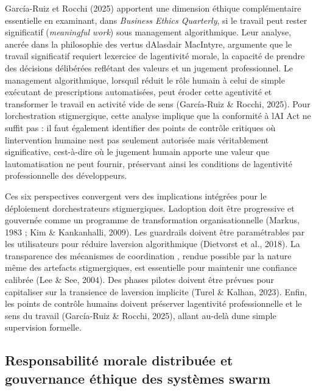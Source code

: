 \documentclass[12pt,a4paper]{article}
\begin{document}
García-Ruiz et Rocchi (2025) apportent une dimension éthique
complémentaire essentielle en examinant, dans \emph{Business Ethics
Quarterly}, si le travail peut rester significatif (\emph{meaningful
work}) sous management algorithmique. Leur analyse, ancrée dans la
philosophie des vertus d\textquotesingle Alasdair MacIntyre, argumente
que le travail significatif requiert l\textquotesingle exercice de
l\textquotesingle agentivité morale, la capacité de prendre des
décisions délibérées reflétant des valeurs et un jugement professionnel.
Le management algorithmique, lorsqu\textquotesingle il réduit le rôle
humain à celui de simple exécutant de prescriptions automatisées, peut
éroder cette agentivité et transformer le travail en activité vide de
sens (García-Ruiz \& Rocchi, 2025). Pour l\textquotesingle orchestration
stigmergique, cette analyse implique que la conformité à
l\textquotesingle AI Act ne suffit pas : il faut également identifier
des points de contrôle critiques où l\textquotesingle intervention
humaine n\textquotesingle est pas seulement autorisée mais véritablement
significative, c\textquotesingle est-à-dire où le jugement humain
apporte une valeur que l\textquotesingle automatisation ne peut fournir,
préservant ainsi les conditions de l\textquotesingle agentivité
professionnelle des développeurs.

Ces six perspectives convergent vers des implications intégrées pour le
déploiement d\textquotesingle orchestrateurs stigmergiques.
L\textquotesingle adoption doit être progressive et gouvernée comme un
programme de transformation organisationnelle (Markus, 1983 ; Kim \&
Kankanhalli, 2009). Les guardrails doivent être paramétrables par les
utilisateurs pour réduire l\textquotesingle aversion algorithmique
(Dietvorst et al., 2018). La transparence des mécanismes de coordination
, rendue possible par la nature même des artefacts stigmergiques,
est essentielle pour maintenir une confiance calibrée (Lee \& See,
2004). Des phases pilotes doivent être prévues pour capitaliser sur la
transience de l\textquotesingle aversion implicite (Turel \& Kalhan,
2023). Enfin, les points de contrôle humains doivent préserver
l\textquotesingle agentivité professionnelle et le sens du travail
(García-Ruiz \& Rocchi, 2025), allant au-delà d\textquotesingle une
simple supervision formelle.

\subsection{Responsabilité morale distribuée et gouvernance éthique des
systèmes
swarm}\label{responsabilituxe9-morale-distribuuxe9e-et-gouvernance-uxe9thique-des-systuxe8mes-swarm}
\end{document}
